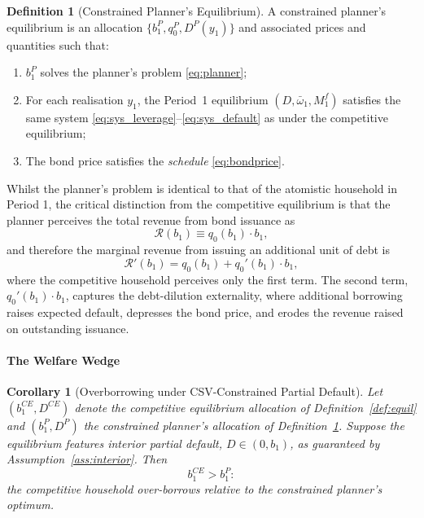 \documentclass[11pt]{article}
\theoremstyle{definition}
\newtheorem{definition}{Definition}
\theoremstyle{plain}
\newtheorem{corollary}{Corollary}
\theoremstyle{remark}
\begin{document}
\begin{definition}[Constrained Planner's Equilibrium]\label{def:planner_equil}
    A constrained planner's equilibrium is an allocation $\{b_1^{P}, q_0^{P}, D^{P}(y_1)\}$ and associated prices and quantities such that:
    \begin{enumerate}[label=(\roman*)]
        \item $b_1^{P}$ solves the planner's problem \eqref{eq:planner};
        \item For each realisation $y_1$, the Period~1 equilibrium $(D, \bar{\omega}_1, M^f_1)$ satisfies the same system \eqref{eq:sys_leverage}--\eqref{eq:sys_default} as under the competitive equilibrium;
        \item The bond price satisfies the \textit{schedule} \eqref{eq:bondprice}.
    \end{enumerate}
\end{definition}

Whilst the planner's problem is identical to that of the atomistic household in Period 1, the critical distinction from the competitive equilibrium is that the planner perceives the total revenue from bond issuance as
\[
    \mathcal{R}(b_1) \equiv q_0(b_1)\cdot b_1,
\]
and therefore the marginal revenue from issuing an additional unit of debt is
\begin{equation}\label{eq:marginal_revenue}
    \mathcal{R}'(b_1) = q_0(b_1) + q_0'(b_1)\cdot b_1,
\end{equation}
where the competitive household perceives only the first term. The second term, $q_0'(b_1)\cdot b_1$, captures the debt-dilution externality, where additional borrowing raises expected default, depresses the bond price, and erodes the revenue raised on outstanding issuance.


\paragraph{The Welfare Wedge}\label{sec:wedge}

\begin{corollary}[Overborrowing under CSV-Constrained Partial Default]\label{prop:overborrowing}
Let $(b_1^{CE}, D^{CE})$ denote the competitive equilibrium allocation of Definition~\ref{def:equil} and $(b_1^{P}, D^{P})$ the constrained planner's allocation of Definition~\ref{def:planner_equil}. Suppose the equilibrium features interior partial default, $D \in (0, b_1)$, as guaranteed by Assumption~\ref{ass:interior}. Then
\[
    b_1^{CE} > b_1^{P}:
\]
the competitive household over-borrows relative to the constrained planner's optimum.
\end{corollary}
\end{document}

